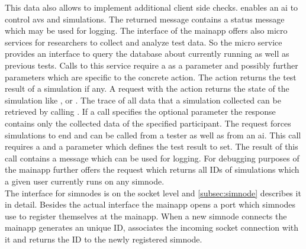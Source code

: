 This data also allows to implement additional client side checks.
 enables an \gls{ai} to control \glspl{av} and simulations.
The returned message contains a status message which may be used for logging.
The interface of the \gls{mainapp} offers also micro services for researchers to collect and analyze test data.
So the micro service  provides an interface to query the database about currently running as well as previous tests.
Calls to this service require a  as a parameter and possibly further parameters which are specific to the concrete action.
The action  returns the test result of a simulation if any.
A request with the action  returns the state of the simulation like \ssrunning{}, \ssfinished{} or \sstimeout{}.
The trace of all data that a simulation collected can be retrieved by calling .
If a call specifies the optional parameter  the response contains only the collected data of the specified participant.
The request  forces simulations to end and can be called from a tester as well as from an \gls{ai}.
This call requires a  and a parameter which defines the test result to set.
The result of this call contains a message which can be used for logging.
For debugging purposes of \drivebuild{} the \gls{mainapp} further offers the request  which returns all IDs of simulations which a given user currently runs on any \gls{simnode}.\\
The interface for \glspl{simnode} is on the socket level and \cref{subsec:simnode} describes it in detail.
Besides the actual interface the \gls{mainapp} opens a port which \glspl{simnode} use to register themselves at the \gls{mainapp}.
When a new \gls{simnode} connects the \gls{mainapp} generates an unique ID, associates the incoming socket connection with it and returns the ID to the newly registered \gls{simnode}.

